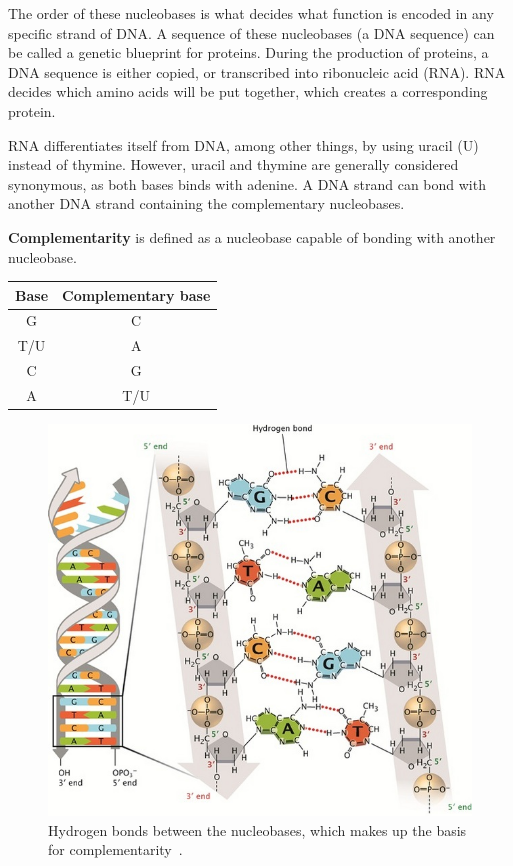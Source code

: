 \documentclass[12pt]{article}
\theoremstyle{definition}
\begin{document}
The order of these nucleobases is what decides what function is encoded in any specific strand of DNA. A sequence of these nucleobases (a DNA sequence) can be called a genetic blueprint for proteins. During the production of proteins, a DNA sequence is either copied, or transcribed into ribonucleic acid (RNA). RNA decides which amino acids will be put together, which creates a corresponding protein.

RNA differentiates itself from DNA, among other things, by using uracil (U) instead of thymine. However, uracil and thymine are generally considered synonymous, as both bases binds with adenine. A DNA strand can bond with another DNA strand containing the complementary nucleobases.

\begin{definition}
\textbf{Complementarity} is defined as a nucleobase capable of bonding with another nucleobase.
\begin{center}
\begin{tabular}{|c|c|}
\hline
Base & Complementary base \\
\hline
G & C \\
T/U & A \\
C & G \\
A & T/U \\
\hline
\end{tabular}
\end{center}
\end{definition}

\begin{figure}[H]
	\label{Complementarity}
	\begin{center}
		\includegraphics[scale=2.5]{complementarity.jpg}	
	\end{center}
	\caption{Hydrogen bonds between the nucleobases, which makes up the basis for complementarity~\cite{DNA-nature}.}
\end{figure}
\end{document}
